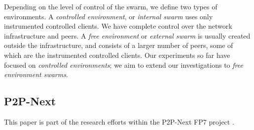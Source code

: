 Depending on the level of control of the swarm, we define two types of
environments. A \textit{controlled environment}, or \textit{internal swarm}
uses only instrumented controlled clients. We have complete control over the
network infrastructure and peers. A \textit{free environment} or
\textit{external swarm} is usually created outside the infrastructure, and
consists of a larger number of peers, some of which are the instrumented
controlled clients. Our experiments so far have focused on \textit{controlled
environments}; we aim to extend our investigations to \textit{free environment
swarms}.

\subsection{P2P-Next}

This paper is part of the research efforts within the P2P-Next FP7 project
\cite{p2p-next}.

